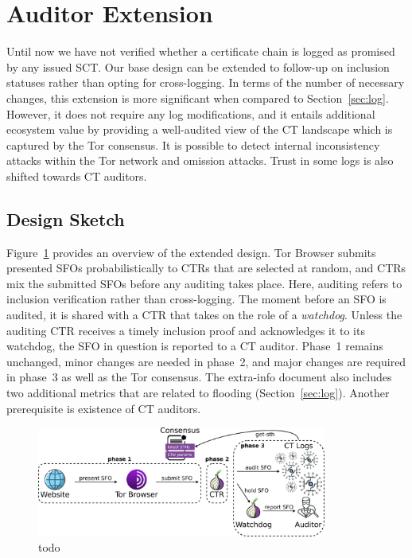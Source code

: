 \section{Auditor Extension} \label{sec:auditor}
Until now we have not verified whether a certificate chain is logged as promised
by any issued SCT.  Our base design can be extended to follow-up on inclusion
statuses rather than opting for cross-logging.  In terms of
the number of necessary changes, this extension is more significant when
compared to Section~\ref{sec:log}.  However, it does not require any log
modifications, and it entails additional ecosystem value by providing a
well-audited view of the CT landscape which is captured by the Tor consensus.
It is possible to detect internal inconsistency attacks within the Tor
network and omission attacks.  Trust in some logs is also shifted towards CT
auditors.

\subsection{Design Sketch} \label{sec:auditor:design}
Figure~\ref{fig:auditor} provides an overview of the extended design.  Tor
Browser submits presented SFOs probabilistically to CTRs that are selected at
random, and CTRs mix the submitted SFOs before any auditing takes place.  Here,
auditing refers to inclusion verification rather than cross-logging.  The moment
before an SFO is audited, it is shared with a CTR that takes on the role of a
\emph{watchdog}.  Unless the auditing CTR receives a timely inclusion proof and
acknowledges it to its watchdog, the SFO in question is reported to a CT
auditor.  Phase~1 remains unchanged, minor changes are needed in phase~2, and
major changes are required in phase~3 as well as the Tor consensus.  The
extra-info document also includes two additional metrics that are related to
flooding (Section~\ref{sec:log}).  Another prerequisite is existence of
CT auditors.

\begin{figure}
    \centering
    \includegraphics[width=0.85\textwidth]{img/design-auditor}
    \caption{todo}
	\label{fig:auditor}
\end{figure}


